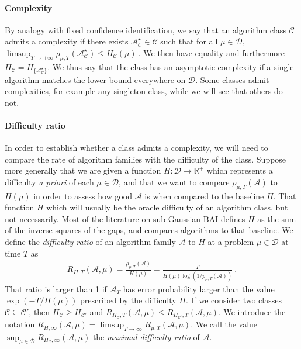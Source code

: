 \documentclass{article}
\begin{document}
\paragraph{Complexity}
\label{par:complexity}

By analogy with fixed confidence identification, we say that an algorithm class $\mathcal C$ admits a complexity if there exists $\mathcal A^\star_{\mathcal C} \in \mathcal C$ such that for all $\mu \in \mathcal D$,
$
\limsup_{T \to +\infty} \rho_{\mu, T}(\mathcal A^\star_{\mathcal C})
\le H_{\mathcal C}(\mu)
\: .
$
We then have equality and furthermore $H_{\mathcal C} = H_{\{\mathcal A^\star_{\mathcal C}\}}$. We thus say that the class has an asymptotic complexity if a single algorithm matches the lower bound everywhere on $\mathcal D$.
Some classes admit complexities, for example any singleton class, while we will see that others do not.

\paragraph{Difficulty ratio}
\label{par:difficulty_ratio}

In order to establish whether a class admits a complexity, we will need to compare the rate of algorithm families with the difficulty of the class.
Suppose more generally that we are given a function $H: \mathcal D \to \mathbb{R}^+$ which represents a difficulty \emph{a priori} of each $\mu \in \mathcal D$, and that we want to compare $\rho_{\mu, T}(\mathcal A)$ to $H(\mu)$ in order to assess how good $\mathcal A$ is when compared to the baseline $H$. That function $H$ which will usually be the oracle difficulty of an algorithm class, but not necessarily.
Most of the literature on sub-Gaussian BAI defines $H$ as the sum of the inverse squares of the gaps, and compares algorithms to that baseline.
We define the \emph{difficulty ratio} of an algorithm family $\mathcal A$ to $H$ at a problem $\mu \in \mathcal D$ at time $T$ as
\begin{align*}
R_{H, T}(\mathcal A,\mu) = \frac{\rho_{\mu, T}(\mathcal A)}{H(\mu)} = \frac{T}{H(\mu) \log(1/p_{\mu, T}(\mathcal A))}
\: .
\end{align*}
That ratio is larger than 1 if $\mathcal A_T$ has error probability larger than the value $\exp(-T/H(\mu))$ prescribed by the difficulty $H$.
If we consider two classes $\mathcal C \subseteq \mathcal C'$, then $H_{\mathcal C} \ge H_{\mathcal C'}$ and $R_{H_{\mathcal C}, T}(\mathcal A,\mu) \le R_{H_{\mathcal C'}, T}(\mathcal A,\mu)$.
We introduce the notation $R_{H,\infty}(\mathcal A,\mu) = \limsup_{T \to \infty} R_{\mu, T}(\mathcal A, \mu)$.
We call the value $\sup_{\mu \in \mathcal D} R_{H_{\mathcal C}, \infty}(\mathcal A, \mu)$ the \emph{maximal difficulty ratio} of $\mathcal A$.
\end{document}
